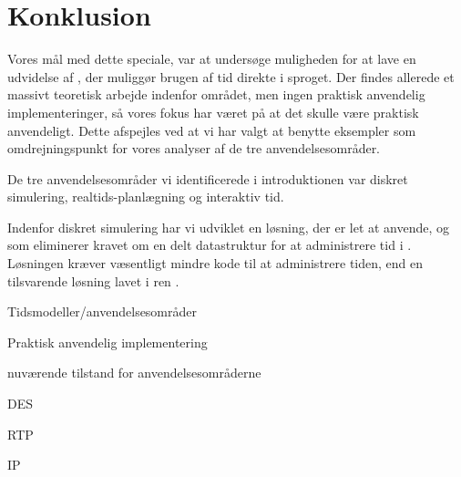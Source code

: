 \chapter{Konklusion} 
\label{chap:konklusion}

Vores mål med dette speciale, var at undersøge muligheden for at lave en udvidelse af \pycsp, der muliggør brugen af tid direkte i sproget. Der findes allerede et massivt teoretisk arbejde indenfor området, men ingen praktisk anvendelig implementeringer, så vores fokus har været på at det skulle være praktisk anvendeligt. Dette afspejles ved at vi har valgt at benytte eksempler som omdrejningspunkt for vores analyser af de tre anvendelsesområder. 

De tre anvendelsesområder vi identificerede i introduktionen var diskret simulering, realtids-planlægning og interaktiv tid. 

Indenfor diskret simulering har vi udviklet en løsning, der er let at anvende, og som eliminerer kravet om en delt datastruktur for at administrere tid i \pycsp. Løsningen kræver væsentligt mindre kode til at administrere tiden, end en tilsvarende løsning lavet i ren \pycsp.  




Tidsmodeller/anvendelsesområder


Praktisk anvendelig implementering


nuværende tilstand for anvendelsesområderne

DES



RTP



IP



